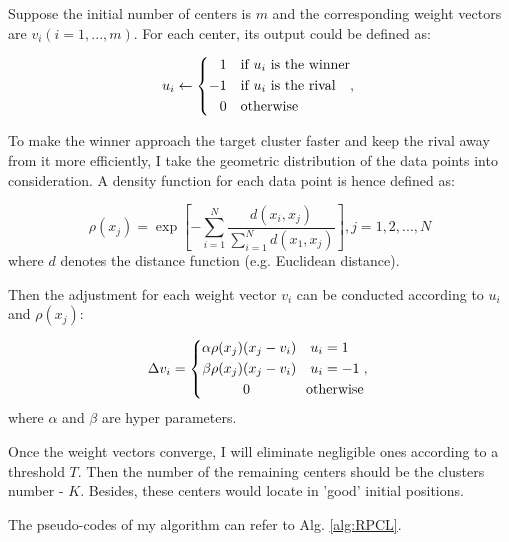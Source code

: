 \documentclass[12pt,a4paper]{article}
\theoremstyle{definition}
\begin{document}
Suppose the initial number of centers is $m$ and the corresponding weight vectors are $v_{i}(i=1,...,m)$. For each center, its output could be defined as:

\begin{equation}
	\centering
	u_{i}\leftarrow \left\{
		\begin{aligned}
			1 & \quad \text{if $u_{i}$ is the winner} \\
			-1 & \quad \text{if $u_{i}$ is the rival} \\
			0 & \quad \text{otherwise}
		\end{aligned},
	\right.
	\label{eqn:1}
\end{equation}

To make the winner approach the target cluster faster and keep the rival away from it more efficiently, I take the geometric distribution of the data points into consideration. A density function for each data point is hence defined as:

\begin{equation}
	\rho(x_{j}) = \exp[-\sum\limits_{i=1}^{N}\dfrac{d(x_{i}, x_{j})}{\sum\limits_{i=1}^{N}d(x_{1}, x_{j})}], j = 1,2,...,N
\end{equation}
where $d$ denotes the distance function (e.g. Euclidean distance).

Then the adjustment for each weight vector $v_{i}$ can be conducted according to $u_{i}$ and $\rho(x_{j})$:

\begin{equation}
	\centering
	\Delta v_{i} = \left\{
		\begin{aligned}
			\alpha\rho(x_{j})&(x_{j}-v_{i}) \quad u_{i} = 1 \\
			\beta\rho(x_{j})&(x_{j}-v_{i}) \quad u_{i} = -1 \\
			& 0 \quad \quad \qquad \text{otherwise}
		\end{aligned},
	\right.
	\label{eqn:4}
\end{equation}
where $\alpha$ and $\beta$ are hyper parameters.

Once the weight vectors converge, I will eliminate negligible ones according to a threshold $T$. Then the number of the remaining centers should be the clusters number - $K$. Besides, these centers would locate in 'good' initial positions.

\vspace{0.008\linewidth}
The pseudo-codes of my algorithm can refer to Alg. \ref{alg:RPCL}.
\end{document}
